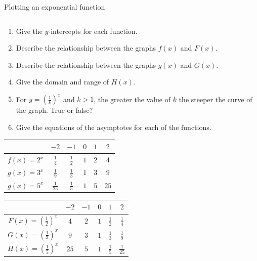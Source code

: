 \begin{wex}{Plotting an exponential function}
{\begin{table}[H]
\begin{center}
\begin{tabular}{|c|c|c|c|c|c|}
\end{tabular}
\end{center}
\end{table}

\begin{enumerate}[noitemsep, label=\textbf{\arabic*}. ] 
 \item Give the $y$-intercepts for each function.
\item Describe the relationship between the graphs $f(x)$ and $F(x)$.
\item Describe the relationship between the graphs $g(x)$ and $G(x)$.
\item Give the domain and range of $H(x)$.
\item For $y=(\frac{1}{k})^{x}$ and $k>1$, the greater the value of $k$ the steeper the curve of the graph. True or false?
\item Give the equations of the asymptotes for each of the functions.
\end{enumerate}

}
{
\begin{table}[H]
\begin{center}
\begin{tabular}{|c|c|c|c|c|c|}
\hline
   &  $-2$ & $-1$ & $0$ & $1$ & $2$ 
\\ \hline
 $f(x)=2^{x}$& $\frac{1}{4}$ &$\frac{1}{2}$&$1$&$2$&$4$
\\ \hline
 $g(x)=3^{x}$& $\frac{1}{9}$ &$\frac{1}{3}$&$1$&$3$&$9$
\\ \hline
 $g(x)=5^{x}$& $\frac{1}{25}$ &$\frac{1}{5}$&$1$&$5$&$25$
\\ \hline

\end{tabular}
\end{center}
\end{table}

\begin{table}[H]
\begin{center}
\begin{tabular}{|c|c|c|c|c|c|}
\hline
   &  $-2$ & $-1$ & $0$ & $1$ & $2$ 
\\ \hline
 $F(x)=(\frac{1}{2})^{x}$& $4$ &$2$&$1$&$\frac{1}{2}$&$\frac{1}{4}$
\\ \hline
$G(x)=(\frac{1}{3})^{x}$&  $9$&$3$&$1$&$\frac{1}{3}$&$\frac{1}{9}$
\\ \hline
$H(x)=(\frac{1}{5})^{x}$& $25$& $5$&$1$&$\frac{1}{5}$&$\frac{1}{25}$
\\ \hline


\end{tabular}
\end{center}
\end{table}}
\end{wex}
